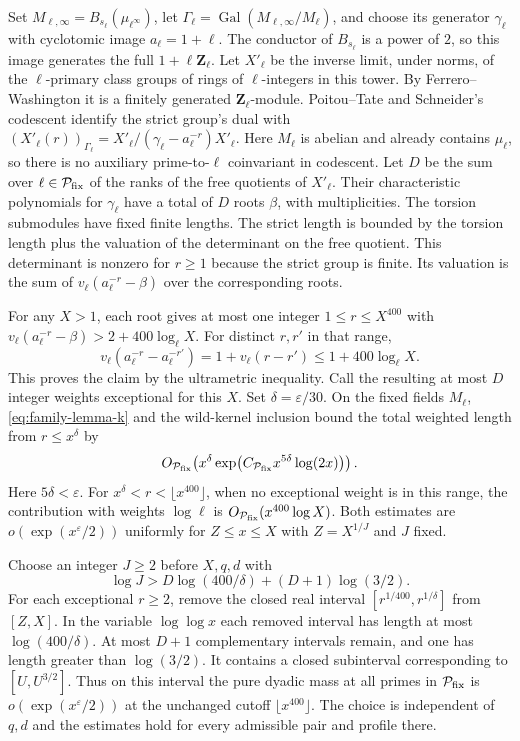 Set \(M_{\ell,\infty}=B_{s_\ell}(\mu_{\ell^\infty})\),
let \(\Gamma_\ell=\operatorname{Gal}(M_{\ell,\infty}/M_\ell)\), and
choose its generator \(\gamma_\ell\) with cyclotomic image
\(a_\ell=1+\ell\). The conductor of \(B_{s_\ell}\) is a power of \(2\),
so this image generates the full \(1+\ell\mathbf Z_\ell\).
Let \(X'_\ell\) be the inverse limit, under norms, of the
\(\ell\)-primary class groups of rings of \(\ell\)-integers in this
tower. By Ferrero--Washington it is a finitely generated
\(\mathbf Z_\ell\)-module. Poitou--Tate and Schneider's codescent
identify the strict group's dual with
\((X'_\ell(r))_{\Gamma_\ell}=X'_\ell/(\gamma_\ell-a_\ell^{-r})X'_\ell\).
Here \(M_\ell\) is abelian and already contains \(\mu_\ell\), so there
is no auxiliary prime-to-\(\ell\) coinvariant in codescent.
\cite{f2-ferrero-washington}
\cite[Theorem~3.1]{f2-validire}
Let \(D\) be the sum over \(\ell\in\mathcal P_{\rm fix}\) of the ranks of the
free quotients of \(X'_\ell\). Their characteristic polynomials
for \(\gamma_\ell\) have a total of \(D\) roots \(\beta\), with
multiplicities. The torsion submodules have fixed finite lengths.
The strict length is bounded by the torsion length plus the valuation
of the determinant on the free quotient. This determinant is nonzero
for \(r\ge1\) because the strict group is finite. Its valuation is
the sum of \(v_\ell(a_\ell^{-r}-\beta)\) over the corresponding roots.

For any \(X>1\), each root gives at most one integer
\(1\le r\le X^{400}\) with
\(v_\ell(a_\ell^{-r}-\beta)>2+400\log_\ell X\). For distinct
\(r,r'\) in that range,
\[
 v_\ell(a_\ell^{-r}-a_\ell^{-r'})=1+v_\ell(r-r')
 \le 1+400\log_\ell X.
\]
This proves the claim by the ultrametric inequality. Call the resulting
at most \(D\) integer weights exceptional for this \(X\).
Set \(\delta=\varepsilon/30\). On the fixed fields \(M_\ell\),
\eqref{eq:family-lemma-k} and the wild-kernel inclusion bound the
total weighted length from \(r\le x^\delta\) by
\[
 O_{\mathcal P_{\rm fix}}\!\left(
 x^\delta\exp\bigl(C_{\mathcal P_{\rm fix}}
 x^{5\delta}\log(2x)\bigr)\right).
\]
Here \(5\delta<\varepsilon\).
For \(x^\delta<r<\lfloor x^{400}\rfloor\), when no exceptional
weight is in this range, the contribution with weights \(\log\ell\)
is \(O_{\mathcal P_{\rm fix}}(x^{400}\log X)\). Both estimates are
\(o(\exp(x^\varepsilon/2))\) uniformly for \(Z\le x\le X\) with
\(Z=X^{1/J}\) and \(J\) fixed.

Choose an integer \(J\ge2\) before \(X,q,d\) with
\[
 \log J>D\log(400/\delta)+(D+1)\log(3/2).
\]
For each exceptional \(r\ge2\), remove the closed real interval
\([r^{1/400},r^{1/\delta}]\) from \([Z,X]\). In the variable
\(\log\log x\) each removed interval has length at most
\(\log(400/\delta)\). At most \(D+1\) complementary intervals
remain, and one has length greater than \(\log(3/2)\). It contains
a closed subinterval corresponding to \([U,U^{3/2}]\).
Thus on this interval the pure dyadic mass at all primes in
\(\mathcal P_{\rm fix}\) is \(o(\exp(x^\varepsilon/2))\) at the unchanged
cutoff \(\lfloor x^{400}\rfloor\). The choice is independent of
\(q,d\) and the estimates hold for every admissible pair and
profile there.


